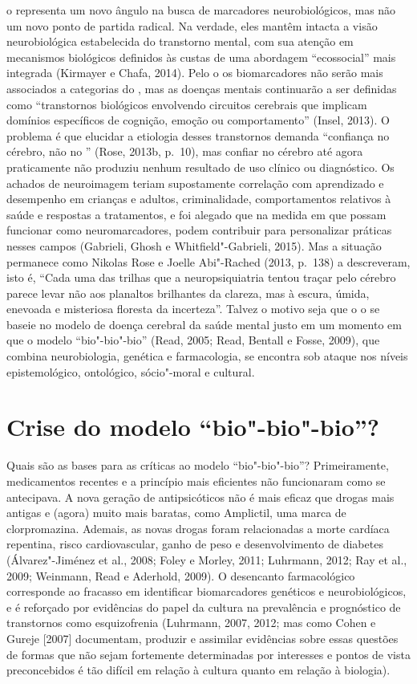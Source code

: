 o representa um novo ângulo na busca de marcadores neurobiológicos,
mas não um novo ponto de partida radical. Na verdade, eles mantêm
intacta a visão neurobiológica estabelecida do transtorno mental, com
sua atenção em mecanismos biológicos definidos às custas de uma
abordagem ``ecossocial'' mais integrada (Kirmayer e Chafa, 2014). Pelo
o os biomarcadores não serão mais associados a categorias do
\emph{}, mas as doenças mentais continuarão a ser definidas como
``transtornos biológicos envolvendo circuitos cerebrais que implicam
domínios específicos de cognição, emoção ou comportamento'' (Insel,
2013). O problema é que elucidar a etiologia desses transtornos demanda
``confiança no cérebro, não no '' (Rose, 2013b, p.~10), mas confiar no
cérebro até agora praticamente não produziu nenhum resultado de uso
clínico ou diagnóstico. Os achados de neuroimagem teriam supostamente
correlação com aprendizado e desempenho em crianças e adultos,
criminalidade, comportamentos relativos à saúde e respostas a
tratamentos, e foi alegado que na medida em que possam funcionar como
neuromarcadores, podem contribuir para personalizar práticas nesses
campos (Gabrieli, Ghosh e Whitfield"-Gabrieli, 2015). Mas a situação
permanece como Nikolas Rose e Joelle Abi"-Rached (2013, p.~138) a
descreveram, isto é, ``Cada uma das trilhas que a neuropsiquiatria
tentou traçar pelo cérebro parece levar não aos planaltos brilhantes da
clareza, mas à escura, úmida, enevoada e misteriosa floresta da
incerteza''. Talvez o motivo seja que o o se baseie no modelo de
doença cerebral da saúde mental justo em um momento em que o modelo
``bio"-bio"-bio'' (Read, 2005; Read, Bentall e Fosse, 2009), que combina
neurobiologia, genética e farmacologia, se encontra sob ataque nos
níveis epistemológico, ontológico, sócio"-moral e cultural.

\chapter{Crise do modelo ``bio"-bio"-bio''?}

Quais são as bases para as críticas ao modelo ``bio"-bio"-bio''?
Primeiramente, medicamentos recentes e a princípio mais eficientes não
funcionaram como se antecipava. A nova geração de antipsicóticos não é
mais eficaz que drogas mais antigas e (agora) muito mais baratas, como
Amplictil, uma marca de clorpromazina. Ademais, as novas drogas foram
relacionadas a morte cardíaca repentina, risco cardiovascular, ganho de
peso e desenvolvimento de diabetes (Álvarez"-Jiménez et al., 2008; Foley
e Morley, 2011; Luhrmann, 2012; Ray et al., 2009; Weinmann, Read e
Aderhold, 2009). O desencanto farmacológico corresponde ao fracasso em
identificar biomarcadores genéticos e neurobiológicos, e é reforçado por
evidências do papel da cultura na prevalência e prognóstico de
transtornos como esquizofrenia (Luhrmann, 2007, 2012; mas como Cohen e
Gureje {[}2007{]} documentam, produzir e assimilar evidências sobre
essas questões de formas que não sejam fortemente determinadas por
interesses e pontos de vista preconcebidos é tão difícil em relação à
cultura quanto em relação à biologia).

